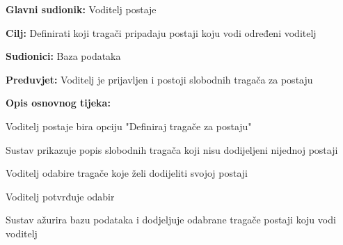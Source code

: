 					\noindent {}
					\begin{packed_item}
						
						\item \textbf{Glavni sudionik: }Voditelj postaje
						\item  \textbf{Cilj:} Definirati koji tragači pripadaju postaji koju vodi određeni voditelj 
						\item  \textbf{Sudionici:} Baza podataka
						\item  \textbf{Preduvjet:} Voditelj je prijavljen i postoji slobodnih tragača za postaju
						\item  \textbf{Opis osnovnog tijeka:}
						
						\item[] \begin{packed_enum}
							
							\item Voditelj postaje bira opciju "Definiraj tragače za postaju" 
							\item Sustav prikazuje popis slobodnih tragača koji nisu dodijeljeni nijednoj postaji 
							\item Voditelj odabire tragače koje želi dodijeliti svojoj postaji 
							\item Voditelj potvrđuje odabir 
							\item Sustav ažurira bazu podataka i dodjeljuje odabrane tragače postaji koju vodi voditelj 
						\end{packed_enum}
					\end{packed_item}
					
